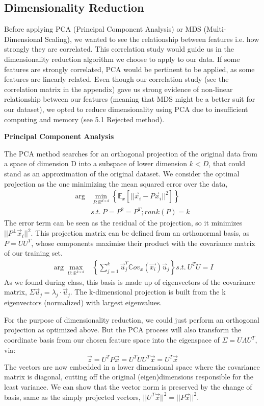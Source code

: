 \documentclass[twocolumn]{article}
\begin{document}
\subsection{Dimensionality Reduction}
\label{4.2}
Before applying PCA (Principal Component Analysis) or MDS (Multi-Dimensional Scaling), we wanted to see the relationship between features i.e. how strongly they are correlated. This correlation study would guide us in the dimensionality reduction algorithm we choose to apply to our data. If some features are strongly correlated, PCA would be pertinent to be applied, as some features are linearly related. Even though our correlation study (see the correlation matrix in the appendix) gave us strong evidence of non-linear relationship between our features (meaning that MDS might be a better suit for our dataset), we opted to reduce dimensionality using PCA due to insufficient computing and memory (see 5.1 Rejected method).

\textbf{\large Principal Component Analysis}

The PCA method searches for an orthogonal projection of the original data from a space of dimension D into a subspace of lower dimension $k < D$, that could stand as an approximation of the original dataset. We consider the optimal projection as the one minimizing the mean squared error over the data,
\begin{align*}
\arg &\min \limits_{P : \mathbb{R}^{d \times d}} \left\{ \mathbb{E}_x \left[ ||\Vec{x}_i - P\Vec{x}_i||^2 \right] \right\} \\
&s.t. \  P = P^2 = P^T; rank(P) = k
\end{align*}
The error term can be seen as the residual of the projection, so it minimizes $||P^{\perp}\Vec{x}_i||^2$. This projection matrix can be defined from an orthonormal basis, as $P = UU^T$, whose components maximise their product with the covariance matrix of our training set.
\begin{align*}
 \arg \max \limits_{U : \mathbb{R}^{k \times d}} &\left\{ \sum^k_{j=1}  \Vec{u}^T_j \mathbb{C}ov_x({\Vec{x_i}}) \Vec{u}_j \right\} s.t. \ U^TU = I
\end{align*}
As we found during class, this basis is made up of eigenvectors of the covariance matrix, $\Sigma\Vec{u}_j = \lambda_j \cdot \Vec{u}_j$. The k-dimensional projection is built from the k eigenvectors (normalized) with largest eigenvalues.

For the purpose of dimensionality reduction, we could just perform an orthogonal projection as optimized above. But the PCA process will also transform the coordinate basis from our chosen feature space into the eigenspace of $\Sigma = U \Lambda U^T$, via:
$$\Vec{z} = U^TP\Vec{x} = U^TUU^T\Vec{x} = U^T\Vec{x}$$
The vectors are now embedded in a lower dimensional space where the covariance matrix is diagonal, cutting off the original (eigen)dimensions responsible for the least variance. We can show that the vector norm is preserved by the change of basis, same as the simply projected vectors, $||U^T\Vec{x}||^2 = ||P\Vec{x}||^2$.
\end{document}
